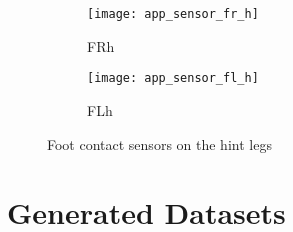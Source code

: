 \begin{figure}[H]
\centering
\begin{subfigure}{0.48\textwidth}
  \centering
  \texttt{[image: app\_sensor\_fr\_h]}
  \caption{FRh}
  \label{fig:app_fr_h}
\end{subfigure}
\begin{subfigure}{0.48\textwidth}
  \centering
  \texttt{[image: app\_sensor\_fl\_h]}
  \caption{FLh}
  \label{fig:app_fl_h}
\end{subfigure}
\caption{Foot contact sensors on the hint legs}
\label{fig:app_f_h}
\end{figure}

\section{Generated Datasets} \label{app:sec:generated_datasets}
